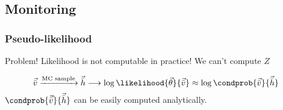 \subsection{Monitoring}
\begin{frame}
  \frametitle{Pseudo-likelihood}

  \begin{alertblock}{Problem!}
    Likelihood is not computable in practice! We can't compute \(Z\)
  \end{alertblock}
	\pause
  \[
    \vec{\bar{v}} \xrightarrow{\text{MC sample}} \vec{\bar{h}} \longrightarrow \log\likelihood{\vec{\theta}}{\vec{\bar{v}}} \approx \log{\condprob{\vec{\bar{v}}}{\vec{\bar{h}}}}
  \]
  \(\condprob{\vec{\bar{v}}}{\vec{\bar{h}}}\) can be easily computed analytically.
\end{frame}
